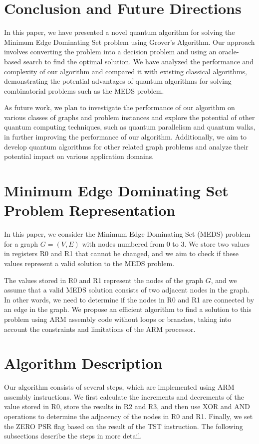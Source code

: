 \section{Conclusion and Future Directions} \label{sec:conclusion}
In this paper, we have presented a novel quantum algorithm for solving the Minimum Edge Dominating Set problem using Grover's Algorithm. Our approach involves converting the problem into a decision problem and using an oracle-based search to find the optimal solution. We have analyzed the performance and complexity of our algorithm and compared it with existing classical algorithms, demonstrating the potential advantages of quantum algorithms for solving combinatorial problems such as the MEDS problem.

As future work, we plan to investigate the performance of our algorithm on various classes of graphs and problem instances and explore the potential of other quantum computing techniques, such as quantum parallelism and quantum walks, in further improving the performance of our algorithm. Additionally, we aim to develop quantum algorithms for other related graph problems and analyze their potential impact on various application domains.






\section{Minimum Edge Dominating Set Problem Representation}
In this paper, we consider the Minimum Edge Dominating Set (MEDS) problem for a graph $G = (V, E)$ with nodes numbered from 0 to 3. We store two values in registers R0 and R1 that cannot be changed, and we aim to check if these values represent a valid solution to the MEDS problem.

The values stored in R0 and R1 represent the nodes of the graph $G$, and we assume that a valid MEDS solution consists of two adjacent nodes in the graph. In other words, we need to determine if the nodes in R0 and R1 are connected by an edge in the graph. We propose an efficient algorithm to find a solution to this problem using ARM assembly code without loops or branches, taking into account the constraints and limitations of the ARM processor.

\section{Algorithm Description}
Our algorithm consists of several steps, which are implemented using ARM assembly instructions. We first calculate the increments and decrements of the value stored in R0, store the results in R2 and R3, and then use XOR and AND operations to determine the adjacency of the nodes in R0 and R1. Finally, we set the ZERO PSR flag based on the result of the TST instruction. The following subsections describe the steps in more detail.

